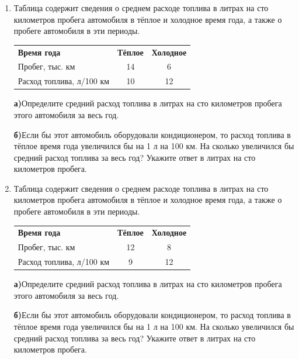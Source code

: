 \documentclass[a4paper,12pt]{article}
\newcommand{\taskspace}{\par\vspace{0.42cm}}
\newcommand{\subtask}[2]{\par\medskip\textbf{#1}\enspace #2\par\vspace{0.22cm}}
\begin{document}
\begin{enumerate}[resume]
\item Таблица содержит сведения о среднем расходе топлива в литрах на сто километров пробега автомобиля в тёплое и холодное время года, а также о пробеге автомобиля в эти периоды.
\begin{center}
\renewcommand{\arraystretch}{1.22}
\begin{tabular}{@{}lcc@{}}\textbf{Время года} & \textbf{Тёплое} & \textbf{Холодное} \\
Пробег, тыс. км & 14 & 6 \\
Расход топлива, л/100 км & 10 & 12\end{tabular}
\end{center}
\subtask{а)}{Определите средний расход топлива в литрах на сто километров пробега этого автомобиля за весь год.}
\subtask{б)}{Если бы этот автомобиль оборудовали кондиционером, то расход топлива в тёплое время года увеличился бы на 1 л на 100 км. На сколько увеличился бы средний расход топлива за весь год? Укажите ответ в литрах на сто километров пробега.}

\taskspace

\item Таблица содержит сведения о среднем расходе топлива в литрах на сто километров пробега автомобиля в тёплое и холодное время года, а также о пробеге автомобиля в эти периоды.
\begin{center}
\renewcommand{\arraystretch}{1.22}
\begin{tabular}{@{}lcc@{}}\textbf{Время года} & \textbf{Тёплое} & \textbf{Холодное} \\
Пробег, тыс. км & 12 & 8 \\
Расход топлива, л/100 км & 9 & 12\end{tabular}
\end{center}
\subtask{а)}{Определите средний расход топлива в литрах на сто километров пробега этого автомобиля за весь год.}
\subtask{б)}{Если бы этот автомобиль оборудовали кондиционером, то расход топлива в тёплое время года увеличился бы на 1 л на 100 км. На сколько увеличился бы средний расход топлива за весь год? Укажите ответ в литрах на сто километров пробега.}

\taskspace


\end{enumerate}
\end{document}
